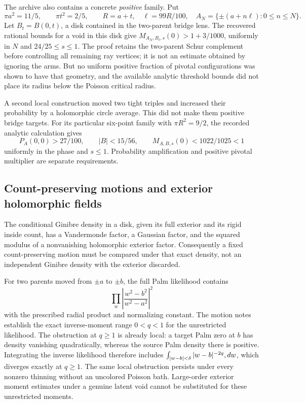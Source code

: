 \documentclass[11pt,a4paper]{article}
\theoremstyle{definition}
\theoremstyle{remark}
\numberwithin{equation}{section}
\begin{document}
The archive also contains a concrete \emph{positive} family.  Put
\[
 \pi a^2=11/5,\qquad\pi t^2=2/5,
 \qquad R=a+t,\quad\ell=99R/100,
 \quad A_N=\{\pm(a+n\ell):0\leq n\leq N\}.
\]
Let $B_t=B(0,t)$, a disk contained in the two-parent bridge lens.
The recovered rational bounds for a void in this disk give
$M_{A_N,B_t,s}(0)>1+3/1000$, uniformly in $N$ and
$24/25\leq s\leq1$.  The proof retains the two-parent Schur complement
before controlling all remaining ray vertices; it is not an estimate
obtained by ignoring the arms.  But no uniform positive fraction of
pivotal configurations was shown to have that geometry, and the
available analytic threshold bounds did not place its radius below the
Poisson critical radius.

A second local construction moved two tight triples and increased their
probability by a holomorphic circle average.  This did not make them
positive bridge targets.  For its particular six-point family with
$\pi R^2=9/2$, the recorded analytic calculation gives
\[
 P_A(0,0)>27/100,\qquad |B|<15/56,
 \qquad M_{A,B,s}(0)<1022/1025<1
\]
uniformly in the phase and $s\leq1$.  Probability amplification and
positive pivotal multiplier are separate requirements.

\subsection{Count-preserving motions and exterior holomorphic fields}
\label{br:motions}

The conditional Ginibre density in a disk, given its full exterior and
its rigid inside count, has a Vandermonde factor, a Gaussian factor, and
the squared modulus of a nonvanishing holomorphic exterior factor.
Consequently a fixed count-preserving motion must be compared under
that exact density, not an independent Ginibre density with the
exterior discarded.

For two parents moved from $\pm a$ to $\pm b$, the full Palm likelihood
contains
\[
 \prod_{w}\left|\frac{w^2-b^2}{w^2-a^2}\right|^2
\]
with the prescribed radial product and normalizing constant.  The
motion notes establish the exact inverse-moment range $0<q<1$ for
the unrestricted likelihood.  The obstruction at $q\geq1$ is already
local: a target Palm zero at $b$ has density vanishing quadratically,
whereas the source Palm density there is positive.  Integrating the
inverse likelihood therefore includes
$\int_{|w-b|<\delta}|w-b|^{-2q}\\,dw$, which diverges exactly at
$q\geq1$.  The same local obstruction persists under every nonzero
thinning without an uncolored Poisson bath.  Large-order exterior
moment estimates under a genuine latent void cannot be substituted
for these unrestricted moments.
\end{document}
